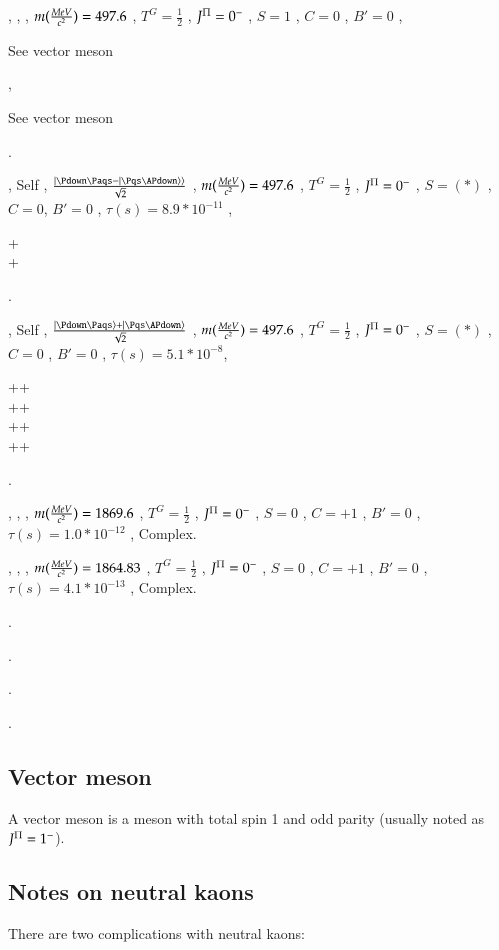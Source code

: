 \documentclass[main.tex]{subfiles}
\begin{document}
\begin{itemize*}
\item \PKz , \PaKz , \Pdown\Paqs , $m(\frac{MeV}{c^2})=497.6$ , $T^G=\frac{1}{2}$ , $J^{\Pi}=0^-$ , $S=1$ , $C=0$ , $B'=0$ , \parbox{1cm}{See vector meson} , \parbox{1cm}{See vector meson}.

\item \PKzS , Self , $\frac{\ket{\Pdown\Paqs-\ket{\Pqs\APdown}}}{\sqrt{2}}$ , $m(\frac{MeV}{c^2})=497.6$ , $T^G=\frac{1}{2}$ , $J^{\Pi}=0^-$ , $S=(*)$ , $C=0$, $B'=0$ , $\tau (s)=8.9*10^{-11}$ , \parbox{4cm}{\Ppiplus+\Ppiminus\\\Ppizero+\Ppizero}.

\item \PKzL , Self , $\frac{\ket{\Pdown\Paqs}+\ket{\Pqs\APdown}}{\sqrt{2}}$ , $m(\frac{MeV}{c^2})=497.6$ , $T^G=\frac{1}{2}$ , $J^{\Pi}=0^-$ , $S=(*)$ , $C=0$ , $B'=0$ , $\tau (s)=5.1*10^{-8}$, \parbox{4cm}{\Ppipm+\Pemp+\Pnue\\\Ppipm+\Pgmmp+\Pnum\\\Ppizero+\Ppizero+\Ppizero\\\Ppiplus+\Ppizero+\Ppiminus}.

\item \PDp , \PDm , \Pqc\APdown , $m(\frac{MeV}{c^2})=1869.6$ , $T^G=\frac{1}{2}$ , $J^{\Pi}=0^-$ , $S=0$ , $C=+1$ , $B'=0$ , $\tau (s)=1.0*10^{-12}$ , Complex.

\item \PDz,  \PaDz,  \Pqc\APup,  $m(\frac{MeV}{c^2})=1864.83$ , $T^G=\frac{1}{2}$ , $J^{\Pi}=0^-$ , $S=0$ , $C=+1$ , $B'=0$ , $\tau (s)=4.1*10^{-13}$ , Complex.


\item \PBp.

\item \PBz.

\item \PsB.

\item \PcB.

\end{itemize*}


\subsection{Vector meson}
A vector meson is a meson with total spin 1 and odd parity (usually noted as $J^{\Pi}=1^-$).\\


\subsection{Notes on neutral kaons}
There are two complications with neutral kaons:
\end{document}
